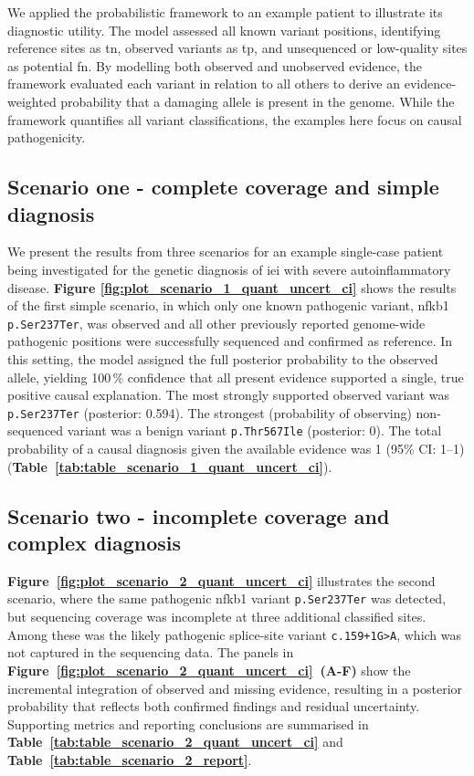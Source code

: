 We applied the probabilistic framework to an example patient to illustrate its diagnostic utility. The model assessed all known variant positions, identifying reference sites as \ac{tn}, observed variants as \ac{tp}, and unsequenced or low-quality sites as potential \ac{fn}. By modelling both observed and unobserved evidence, the framework evaluated each variant in relation to all others to derive an evidence-weighted probability that a damaging allele is present in the genome. While the framework quantifies all variant classifications, the examples here focus on causal pathogenicity.

\subsection{Scenario one - complete coverage and simple diagnosis}
We present the results from three scenarios for an example single-case patient being investigated for the genetic diagnosis of \ac{iei} with severe autoinflammatory disease.
\textbf{Figure \ref{fig:plot_scenario_1_quant_uncert_ci}} shows the results of the first simple scenario, in which only one known pathogenic variant, \ac{nfkb1} \texttt{p.Ser237Ter}, was observed and all other previously reported genome-wide pathogenic positions were successfully sequenced and confirmed as reference. 
In this setting, the model assigned the full posterior probability to the observed allele, yielding 100\,\% confidence that all present evidence supported a single, true positive causal explanation. 
The most strongly supported observed variant was \texttt{p.Ser237Ter} (posterior: 0.594). 
The strongest (probability of observing) non-sequenced variant was a benign variant \texttt{p.Thr567Ile} (posterior: 0). 
The total probability of a causal diagnosis given the available evidence was 1 (95\% CI: 1--1) (\textbf{Table~\ref{tab:table_scenario_1_quant_uncert_ci}}). 

\subsection{Scenario two - incomplete coverage and complex diagnosis}

\textbf{Figure~\ref{fig:plot_scenario_2_quant_uncert_ci}} illustrates the second scenario, where the same pathogenic \ac{nfkb1} variant \texttt{p.Ser237Ter} was detected, but sequencing coverage was incomplete at three additional classified sites. Among these was the likely pathogenic splice-site variant \texttt{c.159+1G{\small\textgreater}A}, which was not captured in the sequencing data. The panels in \textbf{Figure~\ref{fig:plot_scenario_2_quant_uncert_ci}~(A-F)} show the incremental integration of observed and missing evidence, resulting in a posterior probability that reflects both confirmed findings and residual uncertainty. Supporting metrics and reporting conclusions are summarised in \textbf{Table~\ref{tab:table_scenario_2_quant_uncert_ci}} and \textbf{Table~\ref{tab:table_scenario_2_report}}.

